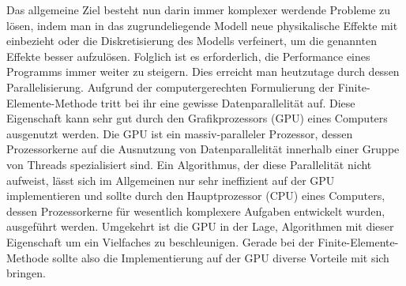 \documentclass[crop=false]{standalone}
\begin{document}
    Das allgemeine Ziel besteht nun darin immer komplexer werdende Probleme zu lösen, indem man in das zugrundeliegende Modell neue physikalische Effekte mit einbezieht oder die Diskretisierung des Modells verfeinert, um die genannten Effekte besser aufzulösen.
    Folglich ist es erforderlich, die Performance eines Programms immer weiter zu steigern.
    Dies erreicht man heutzutage durch dessen Parallelisierung.
    Aufgrund der computergerechten Formulierung der Finite-Elemente-Methode tritt bei ihr eine gewisse Datenparallelität auf.
    Diese Eigenschaft kann sehr gut durch den Grafikprozessors (GPU) eines Computers ausgenutzt werden.
    Die GPU ist ein massiv-paralleler Prozessor, dessen Prozessorkerne auf die Ausnutzung von Datenparallelität innerhalb einer Gruppe von Threads spezialisiert sind.
    Ein Algorithmus, der diese Parallelität nicht aufweist, lässt sich im Allgemeinen nur sehr ineffizient auf der GPU implementieren und sollte durch den Hauptprozessor (CPU) eines Computers, dessen Prozessorkerne für wesentlich komplexere Aufgaben entwickelt wurden, ausgeführt werden.
    Umgekehrt ist die GPU in der Lage, Algorithmen mit dieser Eigenschaft um ein Vielfaches zu beschleunigen.
    Gerade bei der Finite-Elemente-Methode sollte also die Implementierung auf der GPU diverse Vorteile mit sich bringen.
    \cite{Patterson2011,Kirk2010,Sanders2011}

\end{document}

